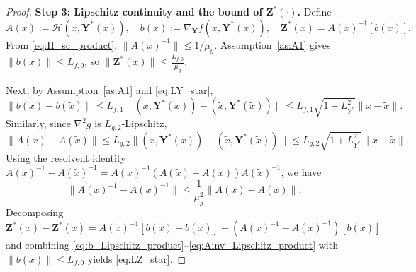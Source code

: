 \documentclass{pkumelon}
\theoremstyle{plain}
\begin{document}
\begin{proof}
\textbf{Step 3: Lipschitz continuity and the bound of $\boldsymbol Z^*(\cdot)$. }
Define
\begin{equation*}
A(x):=\mathcal H(x,\boldsymbol Y^*(x)), \quad b(x):=\nabla_{\boldsymbol Y}f(x,\boldsymbol Y^*(x)), \quad \boldsymbol Z^*(x)=A(x)^{-1}[b(x)].
\end{equation*}
From \eqref{eq:H_sc_product}, $\|A(x)^{-1}\|\le 1/\mu_g$. Assumption~\ref{as:A1} gives $\|b(x)\|\le L_{f,0}$, so $\|\boldsymbol Z^*(x)\|\le \frac{L_{f,0}}{\mu_g}$.

Next, by Assumption~\ref{as:A1} and \eqref{eq:LY_star},
\begin{equation}\label{eq:b_Lipschitz_product}
\|b(x)-b(\tilde x)\|
\le
L_{f,1}\|(x,\boldsymbol Y^*(x))-(\tilde x,\boldsymbol Y^*(\tilde x))\|
\le
L_{f,1}\sqrt{1+L_{Y^*}^2}\|x-\tilde x\|.
\end{equation}
Similarly, since $\nabla^2 g$ is $L_{g,2}$-Lipschitz,
\begin{equation}\label{eq:A_Lipschitz_product}
\|A(x)-A(\tilde x)\|
\le
L_{g,2}\|(x,\boldsymbol Y^*(x))-(\tilde x,\boldsymbol Y^*(\tilde x))\|
\le
L_{g,2}\sqrt{1+L_{Y^*}^2}\|x-\tilde x\|.
\end{equation}
Using the resolvent identity $A(x)^{-1}-A(\tilde x)^{-1} = A(x)^{-1}(A(\tilde x)-A(x))A(\tilde x)^{-1}$, we have
\begin{equation}\label{eq:Ainv_Lipschitz_product}
\|A(x)^{-1}-A(\tilde x)^{-1}\|
\le
\frac{1}{\mu_g^2}\|A(x)-A(\tilde x)\|.
\end{equation}
Decomposing
\begin{equation*}
\boldsymbol Z^*(x)-\boldsymbol Z^*(\tilde x) = A(x)^{-1}[b(x)-b(\tilde x)] + (A(x)^{-1}-A(\tilde x)^{-1})[b(\tilde x)]
\end{equation*}
and combining \eqref{eq:b_Lipschitz_product}--\eqref{eq:Ainv_Lipschitz_product} with $\|b(\tilde x)\|\le L_{f,0}$ yields \eqref{eq:LZ_star}.


\end{proof}
\end{document}
